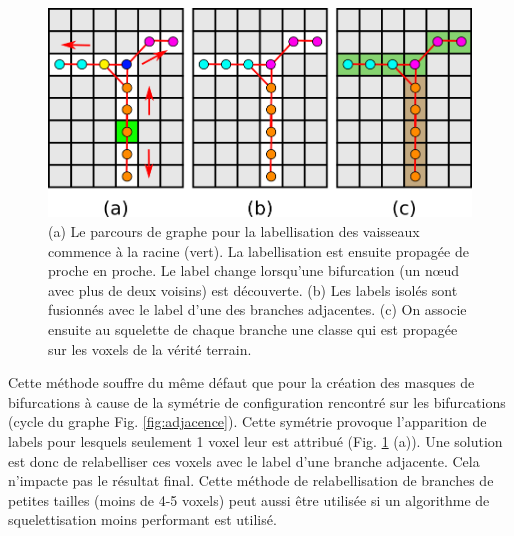 
\begin{figure}[!ht]
  \centering
  \includegraphics[width=\textwidth]{Images/vessels_size_creation.png}
  \caption{ (a) Le parcours de graphe pour la labellisation des vaisseaux commence à la racine (vert). La labellisation est ensuite propagée de proche en proche. Le label change lorsqu'une bifurcation (un nœud avec plus de deux voisins) est découverte. (b) Les labels isolés sont fusionnés avec le label d'une des branches adjacentes. (c) On associe ensuite au squelette de chaque branche une classe qui est propagée sur les voxels de la vérité terrain.}
  \label{fig:graph_traversal}
\end{figure}


Cette méthode souffre du même défaut que pour la création des masques de bifurcations à cause de la symétrie de configuration rencontré sur les bifurcations (cycle du graphe Fig. \ref{fig:adjacence}). Cette symétrie provoque l'apparition de labels pour lesquels seulement 1 voxel leur est attribué (Fig. \ref{fig:graph_traversal} (a)). Une solution est donc de relabelliser ces voxels avec le label d'une branche adjacente. Cela n'impacte pas le résultat final. Cette méthode de relabellisation de branches de petites tailles (moins de 4-5 voxels) peut aussi être utilisée si un algorithme de squelettisation moins performant est utilisé.

